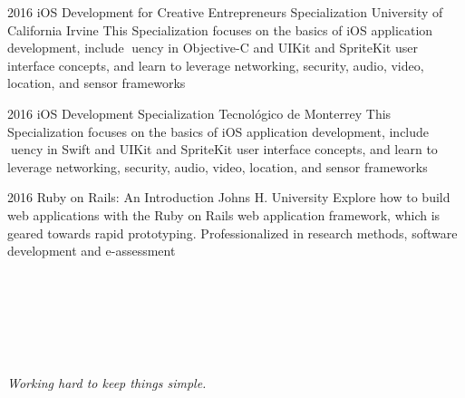 \documentclass[a4paper,nocolors]{cv-friggeri-x}
\begin{document}
\begin{entrylist}


\entry
{2016}
{iOS Development for Creative Entrepreneurs Specialization}
{University of California Irvine}
{This Specialization focuses on the basics of iOS application development, include uency
in Objective-C and UIKit and SpriteKit user interface concepts, and learn to leverage
networking, security, audio, video, location, and sensor frameworks}


\entry
{2016}
{iOS Development Specialization }
{Tecnológico de Monterrey}
{This Specialization focuses on the basics of iOS application development, include uency
in Swift and UIKit and SpriteKit user interface concepts, and learn to leverage networking,
security, audio, video, location, and sensor frameworks}


\entry
{2016}
{Ruby on Rails: An Introduction }
{Johns H. University}
{Explore how to build web applications with the Ruby on Rails web application framework,
which is geared towards rapid prototyping. Professionalized in research methods, software development and e-assessment}

\end{entrylist}
\\
\\
\\
\\
\\
\begin{flushright}
\textit{Working hard to keep things simple.}
\end{flushright}
\end{document}
